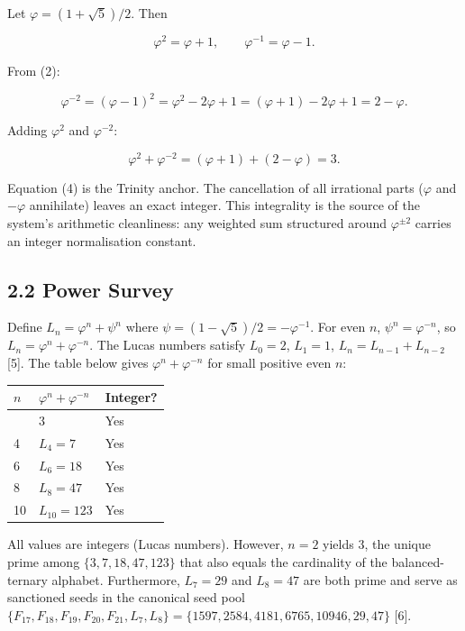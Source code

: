 Let \(\varphi = (1 + \sqrt{5})/2\). Then

\begin{equation}
\varphi^2 = \varphi + 1, \qquad \varphi^{-1} = \varphi - 1. \tag{2}
\end{equation}

From (2):

\begin{equation}
\varphi^{-2} = (\varphi - 1)^2 = \varphi^2 - 2\varphi + 1 = (\varphi + 1) - 2\varphi + 1 = 2 - \varphi. \tag{3}
\end{equation}

Adding \(\varphi^2\) and \(\varphi^{-2}\):

\begin{equation}
\varphi^2 + \varphi^{-2} = (\varphi + 1) + (2 - \varphi) = 3. \tag{4}
\end{equation}

Equation (4) is the Trinity anchor. The
cancellation of all irrational parts (\(\varphi\)
and \(-\varphi\) annihilate) leaves an exact
integer. This integrality is the source of the
system's arithmetic cleanliness: any weighted sum
structured around \(\varphi^{\pm 2}\) carries an
integer normalisation constant.

\subsection{2.2 Power
Survey}\label{fa_03:power-survey}

Define \(L_n = \varphi^n + \psi^n\) where
\(\psi = (1 - \sqrt{5})/2 = -\varphi^{-1}\). For
even \(n\), \(\psi^n = \varphi^{-n}\), so
\(L_n = \varphi^n + \varphi^{-n}\). The Lucas
numbers satisfy \(L_0 = 2\), \(L_1 = 1\),
\(L_n = L_{n-1} + L_{n-2}\) [5]. The table
below gives \(\varphi^n + \varphi^{-n}\) for small
positive even \(n\):

\begin{longtable}[]{@{}lll@{}}
\toprule\noalign{}
\(n\) & \(\varphi^n + \varphi^{-n}\) & Integer? \\
\midrule\noalign{}
\endhead
\bottomrule\noalign{}
\endlastfoot
2 & \(3\) & Yes \\
4 & \(L_4 = 7\) & Yes \\
6 & \(L_6 = 18\) & Yes \\
8 & \(L_8 = 47\) & Yes \\
10 & \(L_{10} = 123\) & Yes \\
\end{longtable}

All values are integers (Lucas numbers). However,
\(n = 2\) yields \(3\), the unique prime among
\(\{3, 7, 18, 47, 123\}\) that also equals the
cardinality of the balanced-ternary alphabet.
Furthermore, \(L_7 = 29\) and \(L_8 = 47\) are
both prime and serve as sanctioned seeds in the
canonical seed pool
\(\{F_{17}, F_{18}, F_{19}, F_{20}, F_{21}, L_7, L_8\} = \{1597, 2584, 4181, 6765, 10946, 29, 47\}\)
[6].

